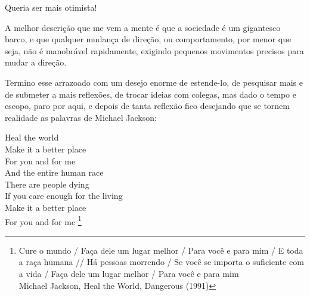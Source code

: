 Queria ser mais otimista!

A melhor descrição que me vem a mente é que a sociedade é um gigantesco barco, e que qualquer mudança de direção, ou comportamento, por menor que seja, não é manobrável rapidamente, exigindo pequenos movimentos precisos para mudar a direção.

Termino esse arrazoado com um desejo enorme de estende-lo, de pesquisar mais e de submeter a mais reflexões, de trocar ideias com colegas, mas dado o tempo e escopo, paro por aqui, e depois de tanta reflexão fico desejando que se tornem realidade as palavras de Michael Jackson:

\begin{citacao}
    Heal the world\\
    Make it a better place\\
    For you and for me\\
    And the entire human race\\

    There are people dying\\
    If you care enough for the living\\
    Make it a better place\\
    For you and for me \footnote{
        Cure o mundo / Faça dele um lugar melhor / Para você e para mim / E toda a raça humana //
        Há pessoas morrendo / Se você se importa o suficiente com a vida / Faça dele um lugar melhor / Para você e para mim \\
        Michael Jackson, Heal the World, Dangerous (1991)
    }
\end{citacao}
